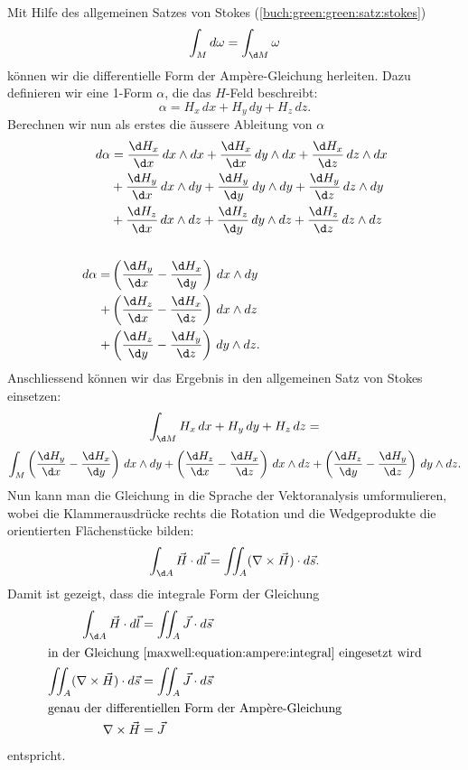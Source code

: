 Mit Hilfe des allgemeinen Satzes von Stokes (\ref{buch:green:green:satz:stokes})
\[
\int_{M} d\omega
=
\int_{\d M} \omega
\]
können wir die differentielle Form der Ampère-Gleichung herleiten.
Dazu definieren wir eine 1-Form $\alpha$, die das $H$-Feld beschreibt:
\[
\alpha
=
H_x \, dx + H_y \, dy + H_z \, dz . 
\]
Berechnen wir nun als erstes die äussere Ableitung von $\alpha$
\begin{align*}
	d\alpha 
	&=
	\frac{\d H_x}{\d x} \, dx \wedge dx + \frac{\d H_x}{\d x} \, dy \wedge dx + \frac{\d H_x}{\d z} \, dz \wedge dx
	\\
	&+
	\frac{\d H_y}{\d x} \, dx \wedge dy + \frac{\d H_y}{\d y} \, dy \wedge dy + \frac{\d H_y}{\d z} \, dz \wedge dy
	\\
	&+
	\frac{\d H_z}{\d x} \, dx \wedge dz + \frac{\d H_z}{\d y} \, dy \wedge dz + \frac{\d H_z}{\d z} \, dz \wedge dz
	\\
	\\
	d\alpha
	=
	&\left(\frac{\d H_y}{\d x} - \frac{\d H_x}{\d y}\right) \, dx \wedge dy
	\\
	+
	&\left(\frac{\d H_z}{\d x} - \frac{\d H_x}{\d z}\right) \, dx \wedge dz
	\\
	+
	&\left(\frac{\d H_z}{\d y} - \frac{\d H_y}{\d z}\right) \, dy \wedge dz .
\end{align*}
Anschliessend können wir das Ergebnis in den allgemeinen Satz von Stokes einsetzen:
\[
\int_{\d M} H_x \, dx + H_y \, dy + H_z \, dz
=
\]
\[
\int_{M} \left(\frac{\d H_y}{\d x} - \frac{\d H_x}{\d y}\right) \, dx \wedge dy
+
\left(\frac{\d H_z}{\d x} - \frac{\d H_x}{\d z}\right) \, dx \wedge dz
+
\left(\frac{\d H_z}{\d y} - \frac{\d H_y}{\d z}\right) \, dy \wedge dz .
\]
Nun kann man die Gleichung in die Sprache der Vektoranalysis umformulieren, wobei die Klammerausdrücke rechts die Rotation und die Wedgeprodukte die orientierten Flächenstücke bilden: 
\begin{equation}
\label{maxwell:equation:ampere:integral}
\int_{\d A} \vec{H} \cdot d\vec{l}
=
\iint_{A} (\nabla \times \vec{H}) \cdot d\vec{s} .
\end{equation}
Damit ist gezeigt, dass die integrale Form der Gleichung
\begin{align}
	\int_{\d A}
	\vec{H} \cdot d\vec{l}
	&=
	\iint_{A}
	\vec{J} \cdot d\vec{s}
	\notag
	\\
	\intertext{in der Gleichung \eqref{maxwell:equation:ampere:integral} eingesetzt wird}
	\iint_{A}
	(
	\nabla \times \vec{H}
	)
	\cdot
	d\vec{s}
	&=
	\iint_{A}
	\vec{J} \cdot d\vec{s}
	\label{maxwell:equation:ampere:differential}
	\\
	\intertext{genau der differentiellen Form der Ampère-Gleichung}
	\nabla \times \vec{H}
	&=
	\vec{J} 
\end{align}
entspricht.

